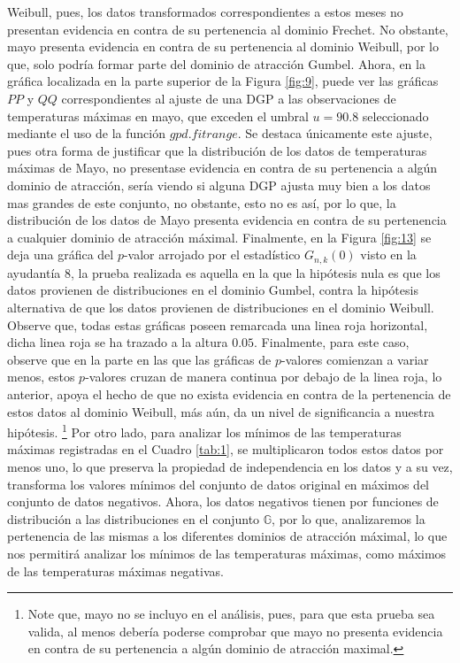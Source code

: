 \documentclass[10.5pt,notitlepage]{article}
\theoremstyle{plain}
\begin{document}
Weibull, pues, los datos transformados correspondientes a estos meses no presentan evidencia en contra de su pertenencia al dominio Frechet. No obstante, mayo presenta evidencia en contra de su pertenencia al dominio Weibull, por lo que, solo podría formar parte del dominio de atracción Gumbel. Ahora, en la gráfica localizada en la parte superior de la Figura \ref{fig:9}, puede ver las gráficas \(PP\) y \(QQ\) correspondientes al ajuste de una DGP a las observaciones de temperaturas máximas en mayo, que exceden el umbral \(u = 90.8\) seleccionado mediante el uso de la función \(gpd.fitrange\). Se destaca únicamente este ajuste, pues otra forma de justificar que la distribución de los datos de temperaturas máximas de Mayo, no presentase evidencia en contra de su pertenencia a algún dominio de atracción, sería viendo si alguna DGP ajusta muy bien a los datos mas grandes de este conjunto, no obstante, esto no es así, por lo que, la distribución de los datos de Mayo presenta evidencia en contra de su pertenencia a cualquier dominio de atracción máximal. Finalmente, en la Figura \ref{fig:13} se deja una gráfica del \(p\)-valor arrojado por el estadístico \(G_{n,k}(0)\) visto en la ayudantía 8, la prueba realizada es aquella en la que la hipótesis nula es que los datos provienen de distribuciones en el dominio Gumbel, contra la hipótesis alternativa de que los datos provienen de distribuciones en el dominio Weibull. Observe que, todas estas gráficas poseen remarcada una linea roja horizontal, dicha linea roja se ha trazado a la altura \(0.05\). Finalmente, para este caso, observe que en la parte en las que las gráficas de \(p\)-valores comienzan a variar menos, estos \(p\)-valores cruzan de manera continua por debajo de la linea roja, lo anterior, apoya el hecho de que no exista evidencia en contra de la pertenencia de estos datos al dominio Weibull, más aún, da un nivel de significancia a nuestra hipótesis. \footnote{Note que, mayo no se incluyo en el análisis, pues, para que esta prueba sea valida, al menos debería poderse comprobar que mayo no presenta evidencia en contra de su pertenencia a algún dominio de atracción maximal.} 
Por otro lado, para analizar los mínimos de las temperaturas máximas registradas en el Cuadro \ref{tab:1}, se multiplicaron todos estos datos por menos uno, lo que preserva la propiedad de independencia en los datos y a su vez, transforma los valores mínimos del conjunto de datos original en máximos del conjunto de datos negativos. Ahora, los datos negativos tienen por funciones de distribución a las distribuciones en el conjunto \(\mathbb{G}\), por lo que, analizaremos la pertenencia de las mismas a los diferentes dominios de atracción máximal, lo que nos permitirá analizar los mínimos de las temperaturas máximas, como máximos de las temperaturas máximas negativas.
\end{document}
